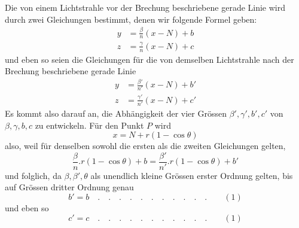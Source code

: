 Die von einem Lichtstrahle vor der Brechung beschriebene gerade Linie wird durch zwei Gleichungen bestimmt, denen wir folgende Formel geben:
\[
\begin{aligned}
y&=\frac\beta n(x-N)+b\\
z&=\frac\gamma n(x-N)+c
\end{aligned}
\]
und eben so seien die Gleichungen für die von demselben Lichtstrahle nach der Brechung beschriebene gerade Linie
\[
\begin{aligned}
y&=\frac{\beta'}{n'}(x-N)+b'\\
z&=\frac{\gamma'}{n'}(x-N)+c'
\end{aligned}
\]
Es kommt also darauf an, die Abhängigkeit der vier Grössen $\beta',\gamma',b',c'$ von $\beta,\gamma,b,c$ zu entwickeln. Für den Punkt $P$ wird
\[
x=N+r(1-\cos\theta)
\]
also, weil für denselben sowohl die ersten als die zweiten Gleichungen gelten,
\[
\frac\beta n.r(1-\cos\theta)+b=\frac{\beta'}{n'}.r(1-\cos\theta)+b'
\]
und folglich, da $\beta,\beta',\theta$ als unendlich kleine Grössen erster Ordnung gelten, bis auf Grössen dritter Ordnung genau
\[
b'=b\quad .\quad .\quad .\quad .\quad .\quad .\quad .\quad .\quad .\quad .\quad .\qquad(1)
\]
und eben so
\[
c'=c\quad .\quad .\quad .\quad .\quad .\quad .\quad .\quad .\quad .\quad .\quad .\qquad(1)
\]

